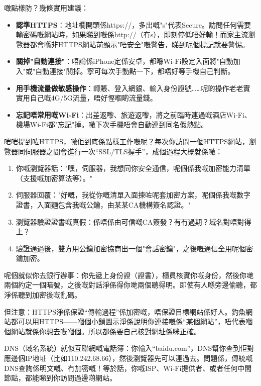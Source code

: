 噉點樣防？幾條實用建議：

\begin{itemize}
  \item \textbf{認準HTTPS}：地址欄開頭係https://，多出嘅"s"代表Secure。訪問任何需要輸密碼嘅網站時，如果睇到嘅係http://（冇s），即刻停低唔好輸！而家主流瀏覽器都會喺非HTTPS網站前顯示"唔安全"嘅警告，睇到呢個標記就要警惕。
  \item \textbf{關掉"自動連接"}：唔論係iPhone定係安卓，都喺Wi-Fi設定入面將"自動加入"或"自動連接"關掉。寧可每次手動點一下，都唔好等手機自己判斷。
  \item \textbf{用手機流量做敏感操作}：轉賬、登入網銀、輸入身份證號……呢啲操作老老實實用自己嘅4G/5G流量，唔好慳嗰啲流量錢。
  \item \textbf{忘記唔常用嘅Wi-Fi}：出差返嚟、旅遊返嚟，將之前臨時連過嘅酒店Wi-Fi、機場Wi-Fi都"忘記"掉。噉下次手機唔會自動連到同名假熱點。
\end{itemize}


啱啱提到咗HTTPS，噉佢到底係點樣工作嘅呢？每次你訪問一個HTTPS網站，瀏覽器同伺服器之間會進行一次“SSL/TLS握手”，成個過程大概就係噉：

\begin{enumerate}
  \item 你嘅瀏覽器話："嘿，伺服器，我想同你安全通信，呢個係我嘅加密能力清單（支援嘅加密算法等）。"
  \item 伺服器回覆："好嘅，我從你嘅清單入面揀咗呢套加密方案，呢個係我嘅數字證書，入面麵包含我嘅公鑰，由某某CA機構簽名認證。"
  \item 瀏覽器驗證證書嘅真假：係唔係由可信嘅CA簽發？有冇過期？域名對唔對得上？
  \item 驗證通過後，雙方用公鑰加密協商出一個"會話密鑰"，之後嘅通信全用呢個密鑰加密。
\end{enumerate}

呢個就似你去銀行辦事：你先遞上身份證（證書），櫃員核實你嘅身份，然後你哋兩個約定一個暗號，之後嘅對話淨係得你哋兩個聽得明。即使有人喺旁邊偷聽，都淨係聽到加密後嘅亂碼。

但注意：HTTPS淨係保證“傳輸過程”係加密嘅，唔保證目標網站係好人。釣魚網站都可以用HTTPS——嗰個小鎖圖示淨係說明你連接嘅係“某個網站”，唔代表嗰個網站就係你想去嘅嗰個。所以都係要自己核對網址係咪正確。


DNS（域名系統）就似互聯網嘅電話簿：你輸入“baidu.com”，DNS幫你查到佢對應邊個IP地址（比如110.242.68.66），然後瀏覽器先可以連過去。問題係，傳統嘅DNS查詢係明文嘅、冇加密嘅！等於話，你嘅ISP、Wi-Fi提供者、或者任何中間節點，都能睇到你訪問過邊啲網站。


